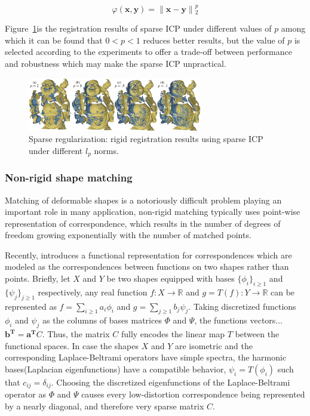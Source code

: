 \small{
\begin{equation}
 \label{eq:permutedsparse}
 \varphi(\mathbf{x},\mathbf{y})=\|\mathbf{x}-\mathbf{y}\|{_2^{p}}
\end{equation}
}

Figure~\ref{fig:sparseICP}is the registration results of sparse ICP under different values of $p$ among which it can be found that $0<p<1$ reduces better results,
but the value of $p$ is selected according to the experiments to offer a trade-off between performance and robustness which may make the sparse ICP unpractical.

\begin{figure}[ht]
  \centering
  \includegraphics[width=3in]{images/sparseICP}
  \caption{Sparse regularization: rigid registration results using sparse ICP\cite{chartrand2007exact} under different $l_{p}$ norms.}
  \label{fig:sparseICP}
\end{figure}

\subsubsection{Non-rigid shape matching}
\label{subsubsec:non-rigid shape matching}

Matching of deformable shapes is a notoriously difficult problem playing an important role in many application, non-rigid matching typically uses point-wise representation of correspondence, which results in the number of degrees of freedom growing exponentially with the number of matched points.

Recently, \cite{ovsjanikov2012functional} introduces a functional representation for correspondences which are modeled as the correspondences between functions on two shapes rather than points.
Briefly, let $X$ and $Y$ be two shapes equipped with bases $\{\phi_{i}\}_{i\ge1}$ and $\{\psi_{j}\}_{j\ge1}$ respectively,
any real function $f: X\to \mathbb{R}$ and $g=T(f): Y\to \mathbb{R}$ can be represented as $f=\sum_{i\ge1}^{}a_{i}\phi_{i}$ and $g=\sum_{j\ge1}^{}b_{j}\psi_{j}$.
Taking discretized functions $\phi_{i}$ and $\psi_{j}$ as the columns of bases matrices $\Phi$ and $\Psi$,
the functions vectors...$\mathbf{b^{T}}=\mathbf{a^{T}}C$.
Thus, the matrix $C$ fully encodes the linear map $T$ between the functional spaces.
In case the shapes $X$ and $Y$ are isometric and the corresponding Laplace-Beltrami operators have simple spectra,
the harmonic bases(Laplacian eigenfunctions) have a compatible behavior, $\psi_{i}=T(\phi_{i})$ such that $c_{ij}=\delta_{ij}$.
Choosing the discretized eigenfunctions of the Laplace-Beltrami operator as $\Phi$ and $\Psi$ causes every low-distortion correspondence being represented by a nearly diagonal, and therefore very sparse matrix $C$.

